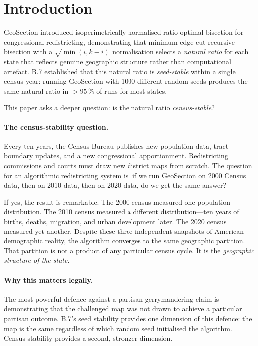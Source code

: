 \section{Introduction}
\label{sec:intro}

GeoSection \citep{b8paper} introduced isoperimetrically-normalised ratio-optimal
bisection for congressional redistricting, demonstrating that minimum-edge-cut
recursive bisection with a $\sqrt{\min(i,k-i)}$ normalisation selects a
\emph{natural ratio} for each state that reflects genuine geographic structure
rather than computational artefact.
B.7 \citep{b7paper} established that this natural ratio is \emph{seed-stable}
within a single census year: running GeoSection with 1000 different random seeds
produces the same natural ratio in $>95\,\%$ of runs for most states.

This paper asks a deeper question: is the natural ratio \emph{census-stable}?

\paragraph{The census-stability question.}
Every ten years, the Census Bureau publishes new population data, tract boundary
updates, and a new congressional apportionment.
Redistricting commissions and courts must draw new district maps from scratch.
The question for an algorithmic redistricting system is: if we run GeoSection on
2000 Census data, then on 2010 data, then on 2020 data, do we get the same
answer?

If yes, the result is remarkable.
The 2000 census measured one population distribution.
The 2010 census measured a different distribution---ten years of births, deaths,
migration, and urban development later.
The 2020 census measured yet another.
Despite these three independent snapshots of American demographic reality, the
algorithm converges to the same geographic partition.
That partition is not a product of any particular census cycle.
It is the \emph{geographic structure of the state}.

\paragraph{Why this matters legally.}
The most powerful defence against a partisan gerrymandering claim is
demonstrating that the challenged map was not drawn to achieve a particular
partisan outcome.
B.7's seed stability provides one dimension of this defence: the map is the
same regardless of which random seed initialised the algorithm.
Census stability provides a second, stronger dimension.

